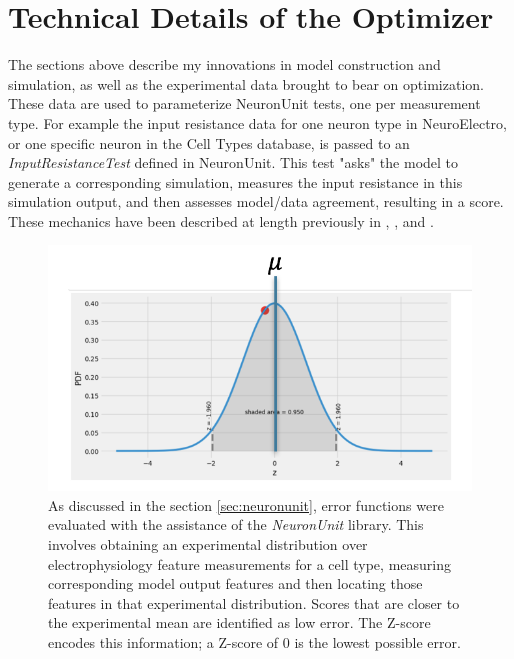 \section{Technical Details of the Optimizer}
The sections above describe my innovations in model construction and simulation, as well as the experimental data brought to bear on optimization. These data are used to parameterize NeuronUnit tests, one per measurement type.
For example the input resistance data for one neuron type in NeuroElectro, or one specific neuron in the Cell Types database, is passed to an \textit{InputResistanceTest} defined in NeuronUnit.
This test "asks" the model to generate a corresponding simulation, measures the input resistance in this simulation output, and then assesses model/data agreement, resulting in a score.
These mechanics have been described at length previously in \cite{omar2014collaborative}, \cite{gerkin_neuronunit}, and \cite{birgiolas2019towards}.

\begin{figure}
\begin{center}
	\includegraphics{figures/normal_distribution}
    \caption[Z-scores for NeuronUnit Tests]{As discussed in the section \ref{sec:neuronunit}, error functions were evaluated with the assistance of the \emph{NeuronUnit} library.
    This involves obtaining an experimental distribution over electrophysiology feature measurements for a cell type, measuring corresponding model output features and then locating those features in that experimental distribution. 
    Scores that are closer to the experimental mean are identified as low error.
	The Z-score encodes this information; a Z-score of 0 is the lowest possible error.}
\end{center}
	
\end{figure}

